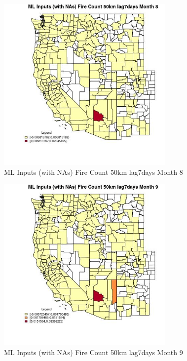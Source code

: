 \begin{figure} 
\centering  
\includegraphics[width=0.77\textwidth]{Code_Outputs/Report_ML_input_PM25_Step4_part_e_de_duplicated_aves_compiled_2019-05-21wNAs_CountyFire_Count_50km_lag7daysmedianMonth8.jpg} 
\caption{\label{fig:Report_ML_input_PM25_Step4_part_e_de_duplicated_aves_compiled_2019-05-21wNAsCountyFire_Count_50km_lag7daysmedianMonth8}ML Inputs (with NAs) Fire Count 50km lag7days Month 8} 
\end{figure} 
 

\begin{figure} 
\centering  
\includegraphics[width=0.77\textwidth]{Code_Outputs/Report_ML_input_PM25_Step4_part_e_de_duplicated_aves_compiled_2019-05-21wNAs_CountyFire_Count_50km_lag7daysmedianMonth9.jpg} 
\caption{\label{fig:Report_ML_input_PM25_Step4_part_e_de_duplicated_aves_compiled_2019-05-21wNAsCountyFire_Count_50km_lag7daysmedianMonth9}ML Inputs (with NAs) Fire Count 50km lag7days Month 9} 
\end{figure} 
 

